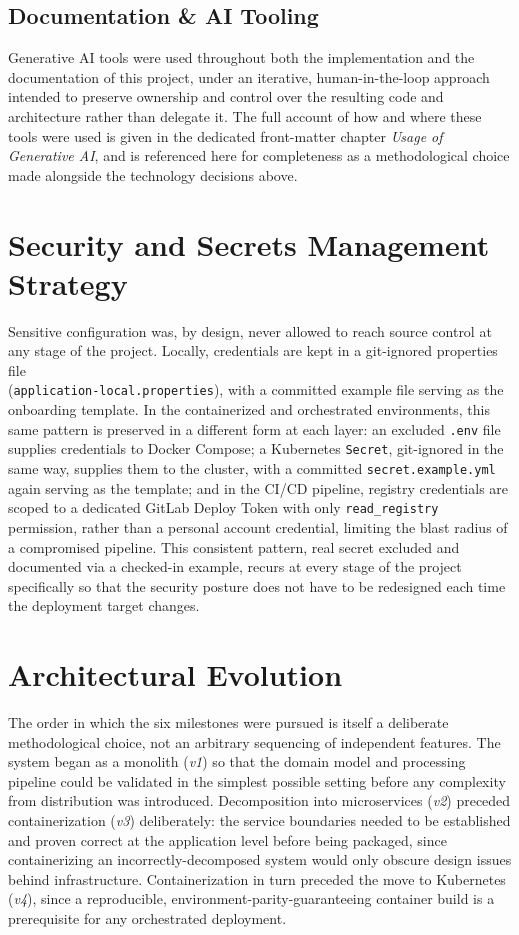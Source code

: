 \documentclass[twoside]{supsistudent}
\begin{document}
\subsection{Documentation \& AI Tooling}
Generative AI tools were used throughout both the implementation and the documentation of this project, under an iterative, human-in-the-loop approach intended to preserve ownership and control over the resulting code and architecture rather than delegate it. The full account of how and where these tools were used is given in the dedicated front-matter chapter \emph{Usage of Generative AI}, and is referenced here for completeness as a methodological choice made alongside the technology decisions above.

\section{Security and Secrets Management Strategy}
Sensitive configuration was, by design, never allowed to reach source control at any stage of the project. Locally, credentials are kept in a git-ignored properties file \\ (\texttt{application-local.properties}), with a committed example file serving as the onboarding template. In the containerized and orchestrated environments, this same pattern is preserved in a different form at each layer: an excluded \texttt{.env} file supplies credentials to Docker Compose; a Kubernetes \texttt{Secret}, git-ignored in the same way, supplies them to the cluster, with a committed \texttt{secret.example.yml} again serving as the template; and in the CI/CD pipeline, registry credentials are scoped to a dedicated GitLab Deploy Token with only \texttt{read\_registry} permission, rather than a personal account credential, limiting the blast radius of a compromised pipeline. This consistent pattern, real secret excluded and documented via a checked-in example, recurs at every stage of the project specifically so that the security posture does not have to be redesigned each time the deployment target changes.

\section{Architectural Evolution}
The order in which the six milestones were pursued is itself a deliberate methodological choice, not an arbitrary sequencing of independent features. The system began as a monolith (\emph{v1}) so that the domain model and processing pipeline could be validated in the simplest possible setting before any complexity from distribution was introduced. Decomposition into microservices (\emph{v2}) preceded containerization (\emph{v3}) deliberately: the service boundaries needed to be established and proven correct at the application level before being packaged, since containerizing an incorrectly-decomposed system would only obscure design issues behind infrastructure. Containerization in turn preceded the move to Kubernetes (\emph{v4}), since a reproducible, environment-parity-guaranteeing container build is a prerequisite for any orchestrated deployment.
\end{document}
